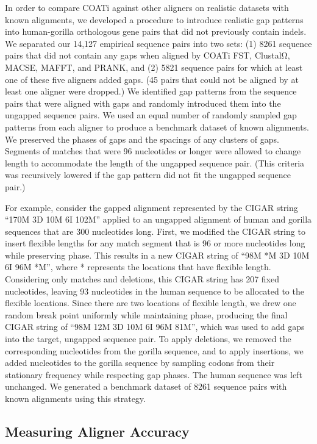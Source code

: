 \documentclass[12pt,letterpaper]{article}
\begin{document}
In order to compare COATi against other aligners on realistic datasets with known alignments, we developed a procedure to introduce realistic gap patterns into human-gorilla orthologous gene pairs that did not previously contain indels. We separated our 14,127 empirical sequence pairs into two sets: %
(1) 8261 sequence pairs that did not contain any gaps when aligned by COATi FST, ClustalΩ, MACSE, MAFFT, and PRANK, and (2) 5821 sequence pairs for which at least one of these five aligners added gaps.
(45 pairs that could not be aligned by at least one aligner were dropped.) We identified gap patterns from the sequence pairs that were aligned with gaps and randomly introduced them into the ungapped sequence pairs. We used an equal number of randomly sampled gap patterns from each aligner to produce a benchmark dataset of known alignments. We preserved the phases of gaps and the spacings of any clusters of gaps. Segments of matches that were 96 nucleotides or longer were allowed to change length to accommodate the length of the ungapped sequence pair. (This criteria was recursively lowered if the gap pattern did not fit the ungapped sequence pair.)

For example, consider the gapped alignment represented by the CIGAR string
%
``170M 3D 10M 6I 102M'' %
%
applied to an ungapped alignment of human and gorilla sequences that are 300 nucleotides long. First, we modified the CIGAR string to insert flexible lengths for any match segment that is 96 or more nucleotides long while preserving phase. This results in a new CIGAR string of
%
``98M *M 3D 10M 6I 96M *M'',
%
where * represents the locations that have flexible length. Considering only matches and deletions, this CIGAR string has 207 fixed nucleotides, leaving 93 nucleotides in the human sequence to be allocated to the flexible locations. Since there are two locations of flexible length, we drew one random break point uniformly while maintaining phase, producing the final CIGAR string of
%
``98M 12M 3D 10M 6I 96M 81M'',
%
which was used to add gaps into the target, ungapped sequence pair.
To apply deletions, we removed the corresponding nucleotides from the gorilla sequence, and to apply insertions, we added nucleotides to the gorilla sequence by sampling codons from their stationary frequency while respecting gap phases. The human sequence was left unchanged.
%
We generated a benchmark dataset of 8261 sequence pairs with known alignments using this strategy.

\subsection*{Measuring Aligner Accuracy}
\end{document}
